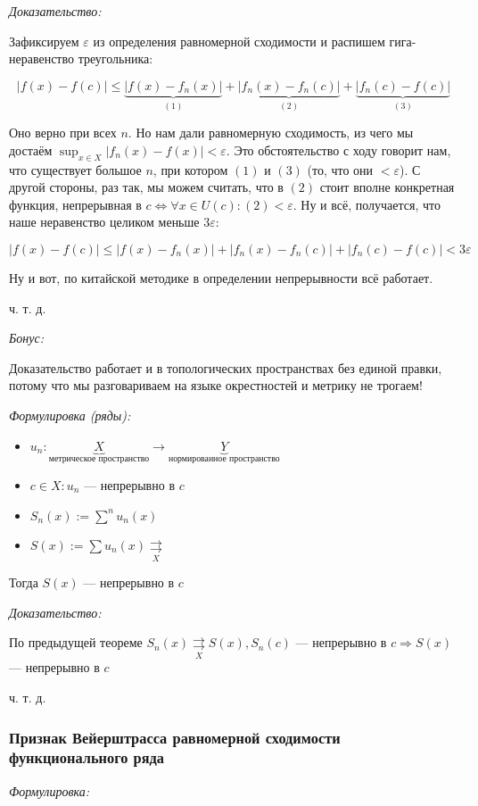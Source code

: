 \documentclass{article}
\def\rsh#1{\underset{#1}{\rightrightarrows}}
\begin{document}
\textit{Доказательство:}

Зафиксируем $\varepsilon$ из определения равномерной сходимости и распишем гига-неравенство треугольника:

\[|f(x) - f(c)| \le \underbrace{|f(x) - f_n(x)|}_{(1)} + \underbrace{|f_n(x) - f_n(c)|}_{(2)} + \underbrace{|f_n(c) - f(c)|}_{(3)}\]

Оно верно при всех $n$. Но нам дали равномерную сходимость, из чего мы достаём $\sup_{x \in X} |f_n(x) - f(x)| < \varepsilon$. Это обстоятельство с ходу говорит нам, что существует большое $n$, при котором $(1)$ и $(3)$ (то, что они $< \varepsilon$). С другой стороны, раз так, мы можем считать, что в $(2)$ стоит вполне конкретная функция, непрерывная в $c \Leftrightarrow \forall x \in U(c): (2) < \varepsilon$. Ну и всё, получается, что наше неравенство целиком меньше $3 \varepsilon$:

\[|f(x) - f(c)| \le |f(x) - f_n(x)| + |f_n(x) - f_n(c)| + |f_n(c) - f(c)| < 3\varepsilon\]

Ну и вот, по китайской методике в определении непрерывности всё работает.

ч. т. д.

\textit{Бонус:}

\Smiley 

Доказательство работает и в топологических пространствах без единой правки, потому что мы разговариваем на языке окрестностей и метрику не трогаем!

\textit{Формулировка (ряды):}

\begin{itemize}
    \item $u_n: \underbrace{X}_{\text{метрическое пространство}} \rightarrow \underbrace{Y}_{\text{нормированное пространство}}$
    \item $c \in X: u_n$ --- непрерывно в $c$ 
    \item $S_n(x) := \sum^n u_n(x)$
    \item $S(x) := \sum u_n(x) \rsh{X}$
\end{itemize}

Тогда $S(x)$ --- непрерывно в $c$

\textit{Доказательство:}

По предыдущей теореме $S_n(x) \rsh{X} S(x), S_n(c)$ --- непрерывно в $c \Rightarrow S(x)$ --- непрерывно в $c$

ч. т. д.

\subsubsection{Признак Вейерштрасса равномерной сходимости функционального ряда}
\textit{Формулировка:}
\end{document}
